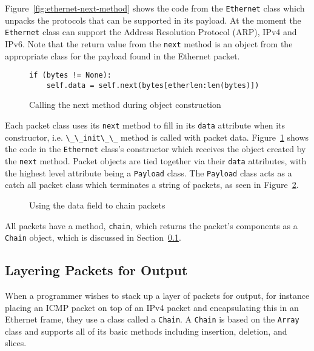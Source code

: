 \documentclass[pdftex]{article}
\begin{document}
Figure~\ref{fig:ethernet-next-method} shows the code from the
\verb|Ethernet| class which unpacks the protocols that can be
supported in its payload.  At the moment the \verb|Ethernet| class
can support the Address Resolution Protocol (ARP), IPv4 and IPv6.
Note that the return value from the \verb|next| method is an object
from the appropriate class for the payload found in the Ethernet packet.

\begin{figure}
  \centering
\begin{lstlisting}
if (bytes != None):
    self.data = self.next(bytes[etherlen:len(bytes)])
  \end{lstlisting}
  \caption{Calling the next method during object construction}
  \label{fig:calling-next-method}
\end{figure}

Each packet class uses its \verb|next| method to fill in its
\verb|data| attribute when its constructor,
i.e. \verb|\_\_init\_\_| method is called with packet data.
Figure~\ref{fig:calling-next-method} shows the code in the
\verb|Ethernet| class's constructor which receives the object created
by the \verb|next| method.  Packet objects are tied together via
their \verb|data| attributes, with the highest level attribute being
a \verb|Payload| class.  The \verb|Payload| class acts as a catch
all packet class which terminates a string of packets, as seen in
Figure~\ref{fig:data-field-chain}.

\begin{figure}
  \centering
\label{fig:data-field-chain}
  \caption{Using the data field to chain packets}
\end{figure}

All packets have a method, \verb|chain|, which returns the packet's
components as a \verb|Chain| object, which is discussed in
Section~\ref{sec:layering-packets-for-output}.

\subsection{Layering Packets for Output}
\label{sec:layering-packets-for-output}

When a programmer wishes to stack up a layer of packets for output,
for instance placing an ICMP packet on top of an IPv4 packet and
encapsulating this in an Ethernet frame, they use a class called a
\verb|Chain|.  A \verb|Chain| is based on the \verb|Array| class
and supports all of its basic methods including insertion, deletion,
and slices.
\end{document}
